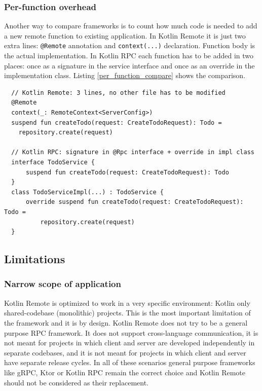 \documentclass[a4paper,11pt,oneside]{article}
\newcommand{\kotlini}[1]{\texttt{#1}}
\begin{document}
\subsubsection{Per-function overhead}

Another way to compare frameworks is to count how much code is needed to add a new remote
function to existing application. In Kotlin Remote it is just two extra lines: \kotlini{@Remote}
annotation and \kotlini{context(...)} declaration. Function body is the actual implementation.
In Kotlin RPC each function has to be added in two places: once as a signature in the service
interface and once as an override in the implementation class. Listing
\ref{per_function_compare} shows the comparison.

\begin{listing}[!h]
  \begin{verbatim}
  // Kotlin Remote: 3 lines, no other file has to be modified
  @Remote
  context(_: RemoteContext<ServerConfig>)
  suspend fun createTodo(request: CreateTodoRequest): Todo = 
    repository.create(request)

  // Kotlin RPC: signature in @Rpc interface + override in impl class
  interface TodoService {
      suspend fun createTodo(request: CreateTodoRequest): Todo
  }
  class TodoServiceImpl(...) : TodoService {
      override suspend fun createTodo(request: CreateTodoRequest): Todo =
          repository.create(request)
  }
  \end{verbatim}
  \caption{Code required for one remote function}\label{per_function_compare}
\end{listing}

\subsection{Limitations}\label{limitations_section}

\subsubsection{Narrow scope of application}\label{narrow_scope_section}

Kotlin Remote is optimized to work in a very specific environment: Kotlin only shared-codebase
(monolithic) projects. This is the most important limitation of the framework and it is by design.
Kotlin Remote does not try to be a general purpose RPC framework. It does not support
cross-language communication, it is not meant for projects in which client and server are developed
independently in separate codebases, and it is not meant for projects in which client and server
have separate release cycles. In all of these scenarios general purpose frameworks like gRPC, Ktor
or Kotlin RPC remain the correct choice and Kotlin Remote should not be considered as their
replacement.
\end{document}
